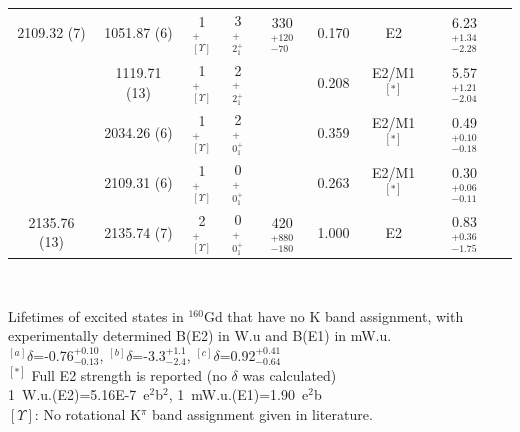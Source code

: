 \begin{table}[h!]
\begin{center}
\begin{tabular}{ccccccccc}
2109.32 (7) & 1051.87 (6) & 1$^+_{[\Upsilon]}$ & 3$^+_{2^+_1}$ & 330$^{+120}_{-70}$   & 0.170 & E2                     & 6.23 $^{+1.34}_{-2.28}$ \\
            & 1119.71 (13)& 1$^+_{[\Upsilon]}$ & 2$^+_{2^+_1}$ &                     & 0.208 & E2/M1$^{[*]}$          & 5.57 $^{+1.21}_{-2.04}$ \\
            & 2034.26 (6) & 1$^+_{[\Upsilon]}$ & 2$^+_{0^+_1}$ &                      & 0.359 & E2/M1$^{[*]}$          & 0.49 $^{+0.10}_{-0.18}$ \\
            & 2109.31 (6) & 1$^+_{[\Upsilon]}$ & 0$^+_{0^+_1}$ &                      & 0.263 & E2/M1$^{[*]}$          & 0.30 $^{+0.06}_{-0.11}$ \\ \hline
2135.76 (13)& 2135.74 (7) & 2$^+_{[\Upsilon]}$ & 0$^+_{0^+_1}$ & 420$^{+880}_{-180}$  & 1.000 & E2         & 0.83 $^{+0.36}_{-1.75}$   \\

\end{tabular}\\ \vspace{10pt}
\end{center}
Lifetimes of excited states in $^{160}$Gd that have no K band assignment, with experimentally determined B(E2) in W.u and  B(E1) in mW.u. \\
$^{[a]}\delta$=-0.76$^{+0.10}_{-0.13}$, $^{[b]}\delta$=-3.3$^{+1.1}_{-2.4}$,  $^{[c]}\delta$=0.92$^{+0.41}_{-0.64}$\\
$^{[*]}$ Full E2 strength is reported (no $\delta$ was calculated)\\
1~W.u.(E2)=5.16E-7~e$^2$b$^2$, 1~mW.u.(E1)=1.90~e$^2$b\\
$[\Upsilon]$: No rotational K$^\pi$ band assignment given in literature.
\end{table}


